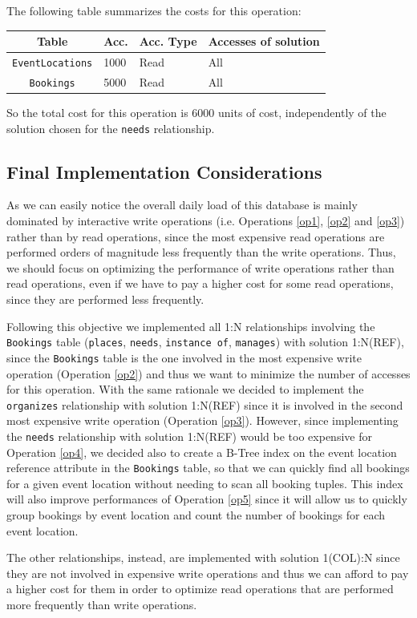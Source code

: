 The following table summarizes the costs for this operation:

\begin{longtable}[H]{|c|p{1cm}|p{1cm}|p{2cm}|}
    \hline
    \textbf{Table} & \textbf{Acc.} & \textbf{Acc. Type} & \textbf{Accesses of solution} \\
    \hline
    \texttt{EventLocations} & 1000 & Read & All \\
    \hline
    \texttt{Bookings} & 5000 & Read & All\\
    \hline
\end{longtable}

So the total cost for this operation is $6000$ units of cost, independently of the solution chosen for the \texttt{needs} relationship.

\subsection{Final Implementation Considerations}

As we can easily notice the overall daily load of this database is mainly dominated by interactive write operations (i.e. Operations \ref{op1}, \ref{op2} and \ref{op3}) rather than by read operations, since the most expensive read operations are performed orders of magnitude less frequently than the write operations. Thus, we should focus on optimizing the performance of write operations rather than read operations, even if we have to pay a higher cost for some read operations, since they are performed less frequently.

Following this objective we implemented all 1:N relationships involving the \texttt{Bookings} table (\texttt{places}, \texttt{needs}, \texttt{instance of}, \texttt{manages}) with solution 1:N(REF), since the \texttt{Bookings} table is the one involved in the most expensive write operation (Operation \ref{op2}) and thus we want to minimize the number of accesses for this operation. With the same rationale we decided to implement the \texttt{organizes} relationship with solution 1:N(REF) since it is involved in the second most expensive write operation (Operation \ref{op3}). However, since implementing the \texttt{needs} relationship with solution 1:N(REF) would be too expensive for Operation \ref{op4}, we decided also to create a B-Tree index on the event location reference attribute in the \texttt{Bookings} table, so that we can quickly find all bookings for a given event location without needing to scan all booking tuples. This index will also improve performances of Operation \ref{op5} since it will allow us to quickly group bookings by event location and count the number of bookings for each event location.

The other relationships, instead, are implemented with solution 1(COL):N since they are not involved in expensive write operations and thus we can afford to pay a higher cost for them in order to optimize read operations that are performed more frequently than write operations.
